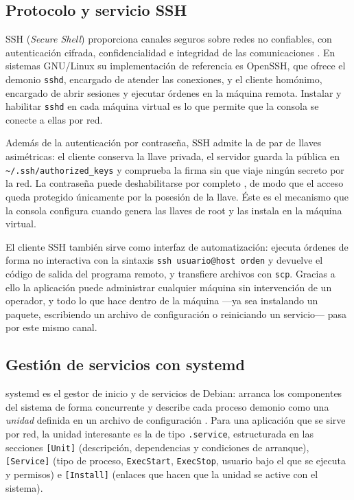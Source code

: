 \subsection{Protocolo y servicio SSH}
\label{sec:mt-ssh}

SSH (\emph{Secure Shell}) proporciona canales seguros sobre redes no
confiables, con autenticación cifrada, confidencialidad e integridad de
las comunicaciones \parencite{rfc4252}. En sistemas GNU/Linux su
implementación de referencia es OpenSSH, que ofrece el demonio
\texttt{sshd}, encargado de atender las conexiones, y el cliente
homónimo, encargado de abrir sesiones y ejecutar órdenes en la máquina
remota. Instalar y habilitar \texttt{sshd} en cada máquina virtual es
lo que permite que la consola se conecte a ellas por red.

Además de la autenticación por contraseña, SSH admite la de par de
llaves asimétricas: el cliente conserva la llave privada, el servidor
guarda la pública en \texttt{\textasciitilde/.ssh/authorized\_keys} y
comprueba la firma sin que viaje ningún secreto por la red. La contraseña
puede deshabilitarse por completo \parencite{rfc4252}, de modo que el
acceso queda protegido únicamente por la posesión de la llave. Éste es
el mecanismo que la consola configura cuando genera las llaves de root y
las instala en la máquina virtual.

El cliente SSH también sirve como interfaz de automatización: ejecuta
órdenes de forma no interactiva con la sintaxis
\texttt{ssh usuario@host orden} y devuelve el código de salida del
programa remoto, y transfiere archivos con \texttt{scp}. Gracias a ello
la aplicación puede administrar cualquier máquina sin intervención de un
operador, y todo lo que hace dentro de la máquina —ya sea instalando un
paquete, escribiendo un archivo de configuración o reiniciando un
servicio— pasa por este mismo canal.

\subsection{Gestión de servicios con systemd}
\label{sec:mt-systemd}

systemd es el gestor de inicio y de servicios de Debian: arranca los
componentes del sistema de forma concurrente y describe cada proceso
demonio como una \emph{unidad} definida en un archivo de configuración
\parencite{systemd}. Para una aplicación que se sirve por red, la unidad
interesante es la de tipo \texttt{.service}, estructurada en las
secciones \texttt{[Unit]} (descripción, dependencias y condiciones de
arranque), \texttt{[Service]} (tipo de proceso, \texttt{ExecStart},
\texttt{ExecStop}, usuario bajo el que se ejecuta y permisos) e
\texttt{[Install]} (enlaces que hacen que la unidad se active con el
sistema).

